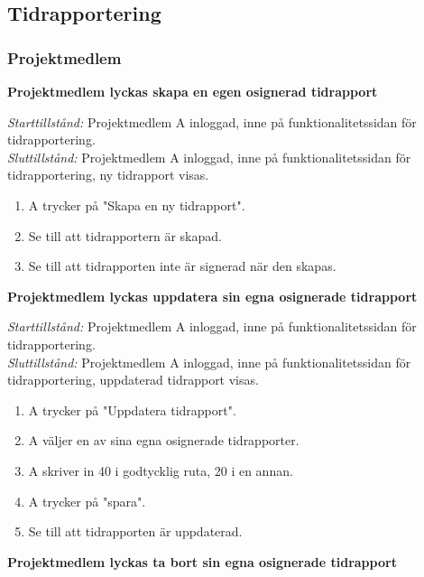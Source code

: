 \documentclass[a4paper]{article}
\begin{document}
\subsection{Tidrapportering}

\subsubsection{Projektmedlem}

\begin{FT}


\item
\textbf{Projektmedlem lyckas skapa en egen osignerad tidrapport} 

\emph{Starttillstånd:} Projektmedlem A inloggad, inne på funktionalitetssidan för tidrapportering.\\
\emph{Sluttillstånd:} Projektmedlem A inloggad, inne på funktionalitetssidan för tidrapportering, ny tidrapport visas.

\begin{enumerate}
\item A trycker på "Skapa en ny tidrapport".
\item Se till att tidrapportern är skapad.
\item Se till att tidrapporten inte är signerad när den skapas.
\end{enumerate}

\item
\textbf{Projektmedlem lyckas uppdatera sin egna osignerade tidrapport}

\emph{Starttillstånd:} Projektmedlem A inloggad, inne på funktionalitetssidan för tidrapportering.\\
\emph{Sluttillstånd:} Projektmedlem A inloggad, inne på funktionalitetssidan för tidrapportering, uppdaterad tidrapport visas.

\begin{enumerate}
\item A trycker på "Uppdatera tidrapport".
\item A väljer en av sina egna osignerade tidrapporter.
\item A skriver in 40 i godtycklig ruta, 20 i en annan.
\item A trycker på "spara".
\item Se till att tidrapporten är uppdaterad.
\end{enumerate}

\item
\textbf{Projektmedlem lyckas ta bort sin egna osignerade tidrapport}


\end{FT}
\end{document}
